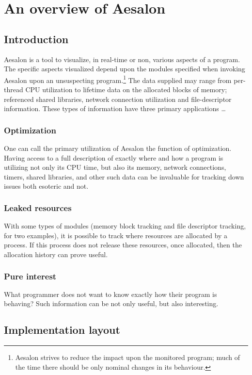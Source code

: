 \chapter{An overview of Aesalon}
\section{Introduction}
\indent Aesalon is a tool to visualize, in real-time or non, various aspects of a program.
The specific aspects visualized depend upon the modules specified when invoking Aesalon
upon an unsuspecting program.\footnote{Aesalon strives to reduce the impact upon the
monitored program; much of the time there should be only nominal changes in its behaviour.}
The data supplied may range from per-thread CPU utilization to lifetime data on the allocated
blocks of memory; referenced shared libraries, network connection utilization and file-descriptor
information. These types of information have three primary applications \ldots

\subsection{Optimization}
One can call the primary utilization of Aesalon the function of optimization. Having access to a
full description of exactly where and how a program is utilizing not only its CPU time, but also
its memory, network connections, timers, shared libraries, and other such data can be invaluable
for tracking down issues both esoteric and not.

\subsection{Leaked resources}
With some types of modules (memory block tracking and file descriptor tracking, for two examples),
it is possible to track where resources are allocated by a process. If this process does not release
these resources, once allocated, then the allocation history can prove useful.

\subsection{Pure interest}
What programmer does not want to know exactly how their program is behaving? Such information can be
not only useful, but also interesting.

\section{Implementation layout}
